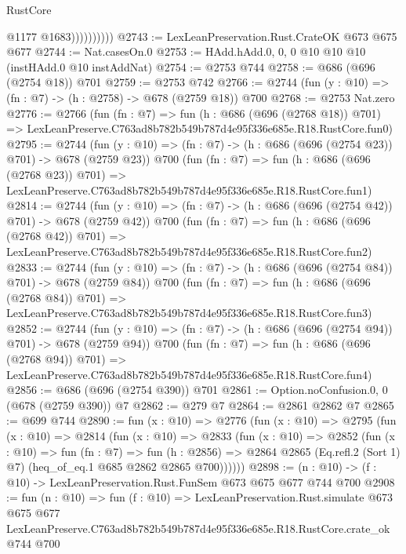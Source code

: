 \begin{lexlean}{RustCore}
\begin{coremodule}
                        @1177
                        @1683))))))))))
@2743 := LexLeanPreservation.Rust.CrateOK @673 @675 @677
@2744 := Nat.casesOn.{0}
@2753 := HAdd.hAdd.{0, 0, 0} @10 @10 @10 (instHAdd.{0} @10 instAddNat)
@2754 := @2753 @744
@2758 := @686 (@696 (@2754 @18)) @701
@2759 := @2753 @742
@2766 := @2744 (fun (y : @10) => (fn : @7) -> (h : @2758) -> @678 (@2759 @18)) @700
@2768 := @2753 Nat.zero
@2776 := @2766
    (fun (fn : @7) =>
    fun (h : @686 (@696 (@2768 @18)) @701) =>
    LexLeanPreserve.C763ad8b782b549b787d4e95f336e685e.R18.RustCore.fun0)
@2795 := @2744
    (fun (y : @10) => (fn : @7) -> (h : @686 (@696 (@2754 @23)) @701) -> @678 (@2759 @23))
    @700
    (fun (fn : @7) =>
    fun (h : @686 (@696 (@2768 @23)) @701) =>
    LexLeanPreserve.C763ad8b782b549b787d4e95f336e685e.R18.RustCore.fun1)
@2814 := @2744
    (fun (y : @10) => (fn : @7) -> (h : @686 (@696 (@2754 @42)) @701) -> @678 (@2759 @42))
    @700
    (fun (fn : @7) =>
    fun (h : @686 (@696 (@2768 @42)) @701) =>
    LexLeanPreserve.C763ad8b782b549b787d4e95f336e685e.R18.RustCore.fun2)
@2833 := @2744
    (fun (y : @10) => (fn : @7) -> (h : @686 (@696 (@2754 @84)) @701) -> @678 (@2759 @84))
    @700
    (fun (fn : @7) =>
    fun (h : @686 (@696 (@2768 @84)) @701) =>
    LexLeanPreserve.C763ad8b782b549b787d4e95f336e685e.R18.RustCore.fun3)
@2852 := @2744
    (fun (y : @10) => (fn : @7) -> (h : @686 (@696 (@2754 @94)) @701) -> @678 (@2759 @94))
    @700
    (fun (fn : @7) =>
    fun (h : @686 (@696 (@2768 @94)) @701) =>
    LexLeanPreserve.C763ad8b782b549b787d4e95f336e685e.R18.RustCore.fun4)
@2856 := @686 (@696 (@2754 @390)) @701
@2861 := Option.noConfusion.{0, 0} (@678 (@2759 @390)) @7
@2862 := @279 @7
@2864 := @2861 @2862 @7
@2865 := @699 @744
@2890 := fun (x : @10) =>
  @2776
    (fun (x : @10) =>
    @2795
      (fun (x : @10) =>
      @2814
        (fun (x : @10) =>
        @2833
          (fun (x : @10) =>
          @2852
            (fun (x : @10) =>
            fun (fn : @7) =>
            fun (h : @2856) =>
            @2864 @2865 (Eq.refl.{2} (Sort 1) @7) (heq_of_eq.{1} @685 @2862 @2865 @700))))))
@2898 := (n : @10) -> (f : @10) -> LexLeanPreservation.Rust.FunSem @673 @675 @677 @744 @700
@2908 := fun (n : @10) =>
  fun (f : @10) =>
  LexLeanPreservation.Rust.simulate
    @673
    @675
    @677
    LexLeanPreserve.C763ad8b782b549b787d4e95f336e685e.R18.RustCore.crate_ok
    @744
    @700
\end{coremodule}
\end{lexlean}
